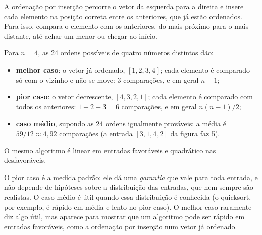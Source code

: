 \begin{exemplo}\label{ex:inscasos}
A ordenação por inserção percorre o vetor da esquerda para a direita e insere cada elemento na posição correta entre os anteriores, que já estão ordenados. Para isso, compara o elemento com os anteriores, do mais próximo para o mais distante, até achar um menor ou chegar ao início.
Para $n=4$, as 24 ordens possíveis de quatro números distintos dão:
\begin{itemize}
  \item \textbf{melhor caso}: o vetor já ordenado, $[1,2,3,4]$; cada elemento é comparado só com o vizinho e não se move: $3$ comparações, e em geral $n-1$;
  \item \textbf{pior caso}: o vetor decrescente, $[4,3,2,1]$; cada elemento é comparado com todos os anteriores: $1+2+3=6$ comparações, e em geral $n(n-1)/2$;
  \item \textbf{caso médio}, supondo as 24 ordens igualmente prováveis: a média é $59/1292$ comparações (a entrada $[3,1,4,2]$ da figura faz 5).
\end{itemize}
O mesmo algoritmo é linear em entradas favoráveis e quadrático nas desfavoráveis.
\end{exemplo}

O pior caso é a medida padrão: ele dá uma \emph{garantia} que vale para toda entrada, e não depende de hipóteses sobre a distribuição das entradas, que nem sempre são realistas. O caso médio é útil quando essa distribuição é conhecida (o quicksort, por exemplo, é rápido em média e lento no pior caso). O melhor caso raramente diz algo útil, mas aparece para mostrar que um algoritmo pode ser rápido em entradas favoráveis, como a ordenação por inserção num vetor já ordenado.

